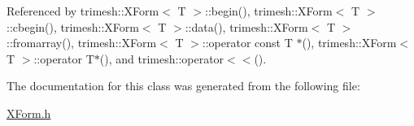 Referenced by trimesh\+::\+X\+Form$<$ T $>$\+::begin(), trimesh\+::\+X\+Form$<$ T $>$\+::cbegin(), trimesh\+::\+X\+Form$<$ T $>$\+::data(), trimesh\+::\+X\+Form$<$ T $>$\+::fromarray(), trimesh\+::\+X\+Form$<$ T $>$\+::operator const T $\ast$(), trimesh\+::\+X\+Form$<$ T $>$\+::operator T$\ast$(), and trimesh\+::operator$<$$<$().



The documentation for this class was generated from the following file\+:\begin{DoxyCompactItemize}
\item 
\hyperlink{XForm_8h}{X\+Form.\+h}\end{DoxyCompactItemize}
